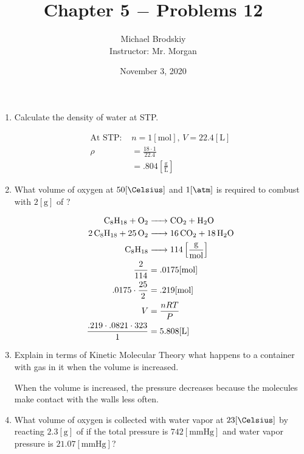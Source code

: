 \documentclass[12pt]{article}
\title{Chapter 5 $-$ Problems 12}
\date{November 3, 2020}
\author{Michael Brodskiy\\ \small Instructor: Mr. Morgan}
\begin{document}
\maketitle

\begin{enumerate}

  \item Calculate the density of water at STP.

    \begin{equation}
      \begin{split}
        \text{At STP: }& n=1[\si{\mole}],\,V=22.4[\si{\liter}]\\
        \rho&=\frac{18\cdot1}{22.4}\\
        &=.804\left[ \frac{\si{\gram}}{\si{\liter}} \right]
      \end{split}
      \label{1}
    \end{equation}

  \item What volume of oxygen at $50[\si{\Celsius}]$ and $1[\si{\atm}]$ is required to combust with $2[\si{\gram}]$ of ?

    \begin{equation}
      \begin{split}
        \ce{C8H18 + O2 &-> CO2 + H2O}\\
        \ce{2C8H18 + 25O2 &-> 16CO2 + 18H2O}\\
        \ce{C8H18 &->} 114\left[ \frac{\si{\gram}}{\si{\mole}} \right]\\
        \frac{2}{114}&=.0175[\si{\mole}]\\
        .0175\cdot\frac{25}{2}&=.219[\si{\mole}]\\
        V&=\frac{nRT}{P}\\
        \frac{.219\cdot.0821\cdot323}{1}&=5.808[\si{\liter}]
      \end{split}
      \label{2}
    \end{equation}
    
  \item Explain in terms of Kinetic Molecular Theory what happens to a container with gas in it when the volume is increased.

    \begin{justifying}
      When the volume is increased, the pressure decreases because the molecules make contact with the walls less often.
    \end{justifying}

  \item What volume of oxygen is collected with water vapor at $23[\si{\Celsius}]$ by reacting $2.3[\si{\gram}]$ of  if the total pressure is $742[\si{\mmHg}]$ and water vapor pressure is $21.07[\si{\mmHg}]$?


\end{enumerate}
\end{document}
